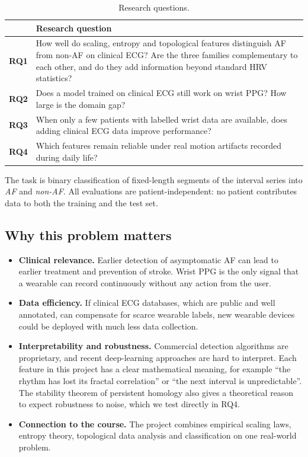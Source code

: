 \documentclass[11pt]{article}
\begin{document}
\begin{table}[ht]
\centering
\caption{Research questions.}
\label{tab:rq}
\begin{tabularx}{\textwidth}{@{}lL@{}}
\toprule
 & Research question \\
\midrule
\textbf{RQ1} & How well do scaling, entropy and topological features
distinguish AF from non-AF on clinical ECG? Are the three families
complementary to each other, and do they add information beyond standard HRV
statistics? \\
\textbf{RQ2} & Does a model trained on clinical ECG still work on wrist PPG?
How large is the domain gap? \\
\textbf{RQ3} & When only a few patients with labelled wrist data are
available, does adding clinical ECG data improve performance? \\
\textbf{RQ4} & Which features remain reliable under real motion artifacts
recorded during daily life? \\
\bottomrule
\end{tabularx}
\end{table}

The task is binary classification of fixed-length segments of the interval
series into \emph{AF} and \emph{non-AF}. All evaluations are
patient-independent: no patient contributes data to both the training and the
test set.

\subsection{Why this problem matters}

\begin{itemize}
  \item \textbf{Clinical relevance.} Earlier detection of asymptomatic AF can
  lead to earlier treatment and prevention of stroke. Wrist PPG is the only
  signal that a wearable can record continuously without any action from the
  user.
  \item \textbf{Data efficiency.} If clinical ECG databases, which are public
  and well annotated, can compensate for scarce wearable labels, new wearable
  devices could be deployed with much less data collection.
  \item \textbf{Interpretability and robustness.} Commercial detection
  algorithms are proprietary, and recent deep-learning approaches are hard to
  interpret. Each feature in this project has a clear mathematical meaning,
  for example ``the rhythm has lost its fractal correlation'' or ``the next
  interval is unpredictable''. The stability theorem of persistent homology
  also gives a theoretical reason to expect robustness to noise, which we
  test directly in RQ4.
  \item \textbf{Connection to the course.} The project combines empirical
  scaling laws, entropy theory, topological data analysis and classification
  on one real-world problem.
\end{itemize}
\end{document}
